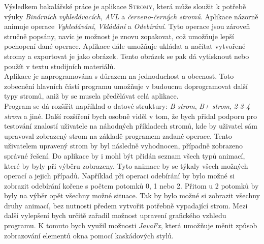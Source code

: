 \documentclass[
  biblatex=false,
  font=serif,
  glossaries=false,
  tables=false,
  theorems=false,
  index
]{kidiplom}
\begin{document}
\begin{kiconclusions}
\indent \indent Výsledkem bakalářské práce je aplikace \textsc{Stromy}, která může sloužit k potřebě výuky \textit{Binárních vyhledávacích}, \textit{AVL} a \textit{červeno-černých stromů}. Aplikace názorně animuje operace \textit{Vyhledávání}, \textit{Vkládání} a \textit{Odebírání}. Tyto operace jsou zároveň stručně popsány, navíc je možnost je znovu zopakovat, což umožňuje lepší pochopení dané operace. Aplikace dále umožňuje ukládat a načítat vytvořené stromy a exportovat je jako obrázek. Tento obrázek se pak dá vytisknout nebo použít v textu studijních materiálů.  \\
\indent Aplikace je naprogramována s důrazem na jednoduchost a obecnost. Toto zobecnění hlavních částí programu umožňuje v budoucnu doprogramovat další typy stromů, aniž by se musela předělávat celá aplikace. \\
\indent Program se dá rozšířit například o datové struktury: \textit{B strom}, \textit{B+ strom}, \textit{2-3-4 strom} a jiné. Další rozšíření bych osobně viděl v tom, že bych přidal podporu pro testování znalostí uživatele na náhodných příkladech stromů, kde by uživatel sám upravoval zobrazený strom na základě programem zadané operace. Tento uživatelem upravený strom by byl následně vyhodnocen, případně zobrazeno správné řešení. Do aplikace by i mohl být přidán seznam všech typů animací, které by byly při výběru zobrazeny. Tyto animace by se týkaly všech možných operací a jejich případů. Například při operaci odebírání by bylo možné si zobrazit odebírání kořene s počtem potomků 0, 1 nebo 2. Přitom u 2 potomků by byly na výběr opět všechny možné situace. Tak by bylo možné si zobrazit všechny druhy animací, bez nutnosti předem vytvořit potřebně vypadající strom. Mezi další vylepšení bych určitě zařadil možnost upravení grafického vzhledu programu. K tomuto bych využil možnosti \textit{JavaFx}, která umožňuje měnit způsob zobrazování elementů okna pomocí kaskádových stylů.

\end{kiconclusions}
\end{document}
